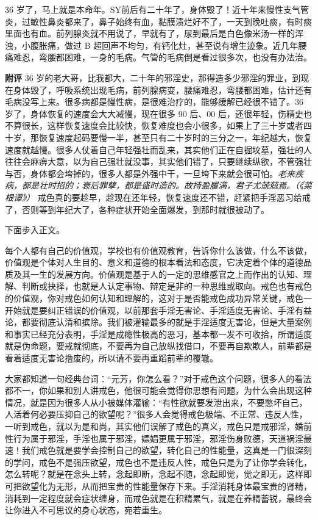 \begin{case}
    36 岁了，马上就是本命年。SY前后有二十年了，身体毁了！近十年来慢性支气管炎，过敏性鼻炎都来了，鼻子始终有血，黏膜溃烂好不了，一天到晚吐痰，有时痰里面也有血。前列腺炎就不用说了，早就有了，尿到最后是白色像米汤一样的浑浊，小腹胀痛，做过 B 超回声不均匀，有钙化灶，甚至说有增生迹象。近几年腰痛难忍，弯腰都困难，一身的毛病。气管的毛病倒是看过很多次，也没有办法治。

    \textbf{附评} 36 岁的老大哥，比我都大，二十年的邪淫史，那得造多少邪淫的罪业，到现在身体毁了，呼吸系统出现毛病，前列腺病变，腰痛难忍，弯腰都困难，估计还有毛病没写上来。很多病都是慢性病，是很难治疗的，能够缓解已经很不错了。36 岁了，身体恢复的速度会大大减慢，现在很多 90 后、00 后，还很年轻，伤精史也不算很长，这样恢复速度会比较快，恢复难度也会小很多，如果上了三十岁或者四十岁，那恢复速度起码要慢一半，甚至只有二十岁时的三分之一，年纪越大，恢复速度就越慢。很多人仗着自己年轻强壮而乱来，其实他们正在自掘坟墓，强壮的人往往会麻痹大意，以为自己强壮就没事，其实他们错了，只要继续纵欲，不管强壮与否，身体都会垮掉的，很多人都是外强中干，一旦垮下来就会很可怕。\textit{老来疾病，都是壮时招的；衰后罪孽，都是盛时造的。故持盈履满，君子尤兢兢焉。（《菜根谭》）} 戒色真的要趁早，趁现在还年轻，恢复速度还不错，赶紧把手淫恶习给戒了，否则等到年纪大了，各种症状开始全面爆发，到那时就很被动了。
\end{case}

下面步入正文。

每个人都有自己的价值观，学校也有价值观教育，告诉你什么该做，什么不该做，价值观是个体对人生目的、意义和道德的根本看法和态度，它决定着个体的道德品质及其一生的发展方向。价值观是基于人的一定的思维感官之上而作出的认知、理解、判断或抉择，也就是人认定事物、辩定是非的一种思维或取向。戒色也有戒色的价值观，你对戒色如何认知和理解的，这对于是否能戒色成功异常关键，戒色一开始就是要纠正错误的价值观，以前那套手淫无害论、手淫适度无害论、手淫有益论，都要彻底认清和摈除。我们被灌输最多的就是手淫适度无害论，但是大量案例和事实已经充分表明，手淫是成瘾性极高的恶习，基本都一发不可收拾，所谓适度就是伪命题，要戒就彻底，不要再为自己放纵找借口，不要再自欺欺人，前辈都是看着适度无害论撸废的，所以请不要再重蹈前辈的覆辙。

大家都知道一句经典台词：“元芳，你怎么看？”对于戒色这个问题，很多人的看法都不一，你如果和别人讲戒色，他很可能会觉得你思想有问题，为什么会出现这种情况，就是因为很多人从小被媒体灌输：“有性欲就要发泄出来，不要憋坏自己，人活着何必要压抑自己的欲望呢？”很多人会觉得戒色极端、不正常、违反人性，一听到戒色，就以为是和尚，其实他们误解了戒色的真义，戒色只是戒邪淫，婚前性行为属于邪淫，手淫也属于邪淫，嫖娼更属于邪淫，邪淫伤身败德，天道祸淫最速！我们戒色就是要学会控制自己的欲望，转化自己的性能量，这真是一门很深刻的学问，戒色不是强压欲望，戒色也不是违反人性，戒色只是为了让你学会转化，怎么转呢？就是在念头上转，念起即断，念起不随，念起即觉，觉之即无，这样即可把欲望化为无形，从而把宝贵的性能量保存下来。手淫消耗身体最宝贵的肾精，消耗到一定程度就会症状缠身，而戒色就是在积精累气，就是在养精蓄锐，最终会让你进入不可思议的身心状态，宛若重生。


